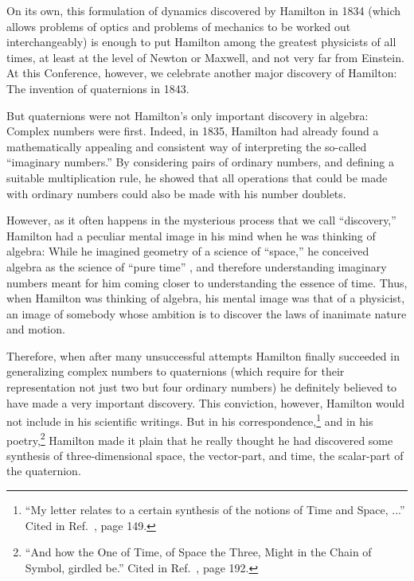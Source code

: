 \documentclass [12pt,a4paper      ]{article}
\begin{document}
     On  its  own,  this formulation of  dynamics  discovered  by 
Hamilton in 1834 (which allows problems of optics and problems of 
mechanics  to  be worked out interchangeably)  is enough  to  put 
Hamilton among the greatest physicists of all times,  at least at 
the level of Newton or Maxwell,  and not very far from  Einstein.       
At this Conference, however, we celebrate another major discovery 
of Hamilton: The invention of quaternions in 1843.

     But quaternions were not Hamilton's only important discovery 
in algebra: Complex numbers were first. Indeed, in 1835, Hamilton 
had  already found a mathematically appealing and consistent  way 
of   interpreting   the  so-called   ``imaginary   numbers.''    By 
considering  pairs of ordinary numbers,  and defining a  suitable 
multiplication rule,  he showed that all operations that could be 
made  with  ordinary numbers could also be made with  his  number 
doublets.

        However,  as  it often happens in the mysterious 
process that we call ``discovery,''  Hamilton had a peculiar mental 
image  in his mind when he was thinking of algebra: 
While   he imagined geometry of a science  of  ``space,''  he 
conceived  algebra  as  the  science  of  ``pure  time''  \cite{R1},  and 
therefore  understanding  imaginary numbers meant for him  coming 
closer to understanding the essence of time.  Thus, when Hamilton 
was  thinking  of  algebra,  his  mental  image  was  that  of  a 
physicist,  an  image of somebody whose ambition is to  discover 
the laws of inanimate nature and motion.

     Therefore,  when after many unsuccessful attempts   Hamilton 
finally succeeded in generalizing complex numbers to quaternions 
(which  require  for their representation not just two  but  four 
ordinary numbers)  he  definitely  believed to have made  a  very 
important discovery.  This conviction,  however,  Hamilton would 
not   include   in  his  scientific   writings.    But   in   his 
correspondence,\footnote{``My letter relates to a certain synthesis of the notions  of Time and Space, ...'' Cited in Ref.~\cite{R1}, page 149.} and in his poetry,\footnote{``And how the One of Time,  of Space the Three,  Might in the 
Chain of Symbol, girdled be.''  Cited in Ref.~\cite{R1}, page 192.} Hamilton made it plain 
that he really thought he had discovered some synthesis of 
three-dimensional space, the vector-part, and time, the scalar-part 
of the quaternion.
\end{document}
